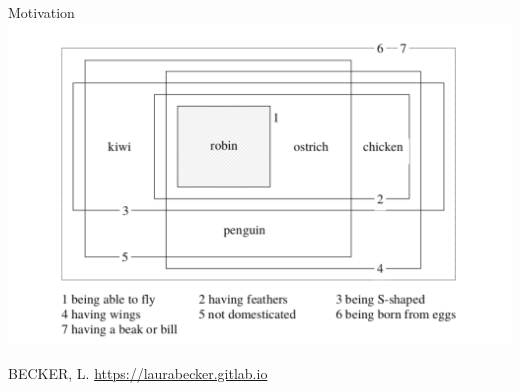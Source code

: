 \documentclass[10pt, xcolor=dvipsnames]{beamer}
\begin{document}
  

\begin{frame}[fragile]{Motivation}
  \includegraphics[scale=.33]{img/familyres.png}

  {\scriptsize BECKER, L. \url{https://laurabecker.gitlab.io}}
\end{frame}


%
%
\end{document}
